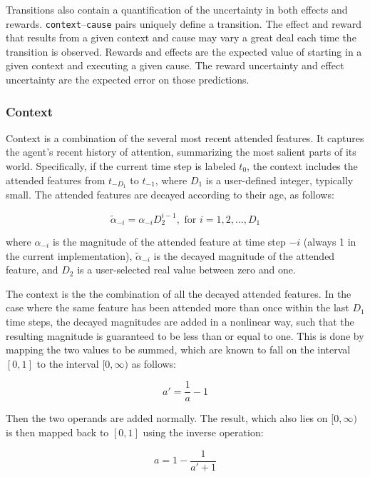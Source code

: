 Transitions also contain a quantification of the uncertainty in both effects and rewards. \texttt{context}--\texttt{cause} pairs uniquely define a transition. The effect and reward that results from a given context and cause may vary a great deal each time the transition is observed. Rewards and effects are the expected value of starting in a given context and executing a given cause. The reward uncertainty and effect uncertainty are the expected error on those predictions.

 
\subsubsection{Context}
Context is a combination of the several most recent attended features. It captures the agent's recent history of attention, summarizing the most salient parts of its world.
Specifically, if the current time step is labeled $t_{0}$, the context includes the attended features from $t_{-D_1}$ to $t_{-1}$, where $D_1$ is a user-defined integer, typically small. The attended features are decayed according to their age, as follows:

\begin{equation}
\tilde{\alpha}_{-i} =  \alpha_{-i} D_2^{i-1}, \mbox{  for } i = 1, 2, ..., D_1  
\end{equation}

where $ \alpha_{-i} $ is the magnitude of the attended feature at time step $-i$ (always 1 in the current implementation), $\tilde{\alpha}_{-i}$ is the decayed magnitude of the attended feature, and $D_2$ is a user-selected real value between zero and one.

The context is the the combination of all the decayed attended features. In the case where the same feature has been attended more than once within the last $D_1$ time steps, the decayed magnitudes are added in a nonlinear way, such that the resulting magnitude is guaranteed to be less than or equal to one. This is done by mapping the two values to be summed, which are known to fall on the interval $[0,1]$ to the interval $[0, \infty)$ as follows:

\begin{equation}
a' = \frac{1}{a} - 1
\label{bounded_sum_map}
\end{equation}

Then the two operands are added normally. The result, which also lies on $[0, \infty)$ is then mapped back to $[0,1]$ using the inverse operation:

\begin{equation}
a = 1 - \frac{1}{a' + 1} 
\label{bounded_sum_unmap}
\end{equation}

